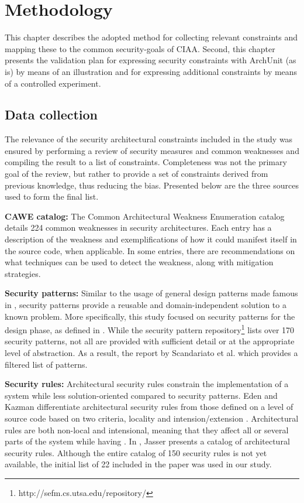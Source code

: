 \chapter{Methodology}

This chapter describes the adopted method for collecting relevant constraints and mapping these to the common security-goals of CIAA. Second, this chapter presents the validation plan for expressing security constraints with ArchUnit (as is) by means of an illustration and for expressing additional constraints by means of a controlled experiment.

\section{Data collection}

The relevance of the security architectural constraints included in the study was ensured by performing a review of security measures and common weaknesses and compiling the result to a list of constraints. Completeness was not the primary goal of the review, but rather to provide a set of constraints derived from previous knowledge, thus reducing the bias. Presented below are the three sources used to form the final list. 

\textbf{CAWE catalog:}
The Common Architectural Weakness Enumeration catalog \cite{santos_catalog_2017} details 224 common weaknesses in security architectures. Each entry has a description of the weakness and exemplifications of how it could manifest itself in the source code, when applicable. In some entries, there are recommendations on what techniques can be used to detect the weakness, along with mitigation strategies.

\textbf{Security patterns:}
Similar to the usage of general design patterns made famous in \cite{gamma_design_1995}, security patterns provide a reusable and domain-independent solution to a known problem. More specifically, this study focused on security patterns for the design phase, as defined in \cite{yoshioka_survey_2008}. While the security pattern repository\footnote{http://sefm.cs.utsa.edu/repository/} lists over 170 security patterns, not all are provided with sufficient detail or at the appropriate level of abstraction. As a result, the report by Scandariato et al. \cite{scandariato_system_2006}  which provides a filtered list of patterns.


\textbf{Security rules:}
Architectural security rules constrain the implementation of a system while less solution-oriented compared to security patterns. Eden and Kazman differentiate architectural security rules from those defined on a level of source code based on two criteria, locality and intension/extension \cite{eden_architecture_2003}. Architectural rules are both non-local and intensional, meaning that they affect all or several parts of the system while having . In \cite{franch_constraining_2019}, Jasser presents a catalog of architectural security rules. Although the entire catalog of 150 security rules is not yet available, the initial list of 22 included in the paper was used in our study.

